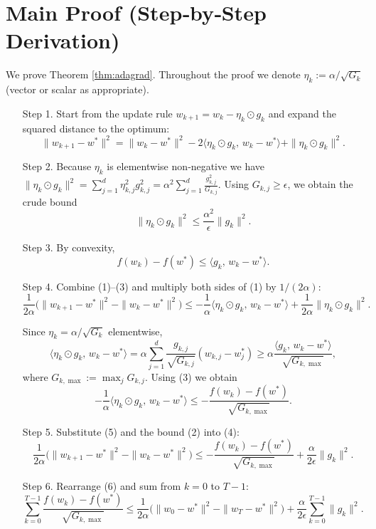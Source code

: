 \documentclass{article}
\begin{document}
\section*{Main Proof (Step‑by‑Step Derivation)}
We prove Theorem \ref{thm:adagrad}.  Throughout the proof we denote
$\eta_k:=\alpha/\sqrt{G_k}$ (vector or scalar as appropriate).

\begin{enumerate}
\item[Step 1.]  Start from the update rule $w_{k+1}=w_k-\eta_k\odot g_k$ and expand the squared distance to the optimum:
\[
\|w_{k+1}-w^{\ast}\|^{2}
= \|w_k-w^{\ast}\|^{2}
-2\langle\eta_k\odot g_k,\,w_k-w^{\ast}\rangle
+\|\eta_k\odot g_k\|^{2}.
\tag{1}
\]

\item[Step 2.]  Because $\eta_k$ is elementwise non‑negative we have
$\|\eta_k\odot g_k\|^{2}= \sum_{j=1}^{d}\eta_{k,j}^{2} g_{k,j}^{2}
= \alpha^{2}\sum_{j=1}^{d}\frac{g_{k,j}^{2}}{G_{k,j}}$.
Using $G_{k,j}\ge \epsilon$, we obtain the crude bound
\[
\|\eta_k\odot g_k\|^{2}\le \frac{\alpha^{2}}{\epsilon}\|g_k\|^{2}.
\tag{2}
\]

\item[Step 3.]  By convexity,
\[
f(w_k)-f(w^{\ast})\le \langle g_k,\,w_k-w^{\ast}\rangle .
\tag{3}
\]

\item[Step 4.]  Combine (1)–(3) and multiply both sides of (1) by $1/(2\alpha)$:
\[
\frac{1}{2\alpha}\bigl(\|w_{k+1}-w^{\ast}\|^{2}-\|w_k-w^{\ast}\|^{2}\bigr)
\le -\frac{1}{\alpha}\langle\eta_k\odot g_k,\,w_k-w^{\ast}\rangle
+\frac{1}{2\alpha}\|\eta_k\odot g_k\|^{2}.
\tag{4}
\]

Since $\eta_k=\alpha/\sqrt{G_k}$ elementwise,
\[
\langle\eta_k\odot g_k,\,w_k-w^{\ast}\rangle
= \alpha\sum_{j=1}^{d}\frac{g_{k,j}}{\sqrt{G_{k,j}}}(w_{k,j}-w^{\ast}_{j})
\ge \alpha\frac{\langle g_k,\,w_k-w^{\ast}\rangle}{\sqrt{G_{k,\max}}},
\]
where $G_{k,\max}:=\max_j G_{k,j}$.  Using (3) we obtain
\[
-\frac{1}{\alpha}\langle\eta_k\odot g_k,\,w_k-w^{\ast}\rangle
\le -\frac{f(w_k)-f(w^{\ast})}{\sqrt{G_{k,\max}}}.
\tag{5}
\]

\item[Step 5.]  Substitute (5) and the bound (2) into (4):
\[
\frac{1}{2\alpha}\bigl(\|w_{k+1}-w^{\ast}\|^{2}-\|w_k-w^{\ast}\|^{2}\bigr)
\le -\frac{f(w_k)-f(w^{\ast})}{\sqrt{G_{k,\max}}}
+\frac{\alpha}{2\epsilon}\|g_k\|^{2}.
\tag{6}
\]

\item[Step 6.]  Rearrange (6) and sum from $k=0$ to $T-1$:
\[
\sum_{k=0}^{T-1}\frac{f(w_k)-f(w^{\ast})}{\sqrt{G_{k,\max}}}
\le
\frac{1}{2\alpha}\bigl(\|w_0-w^{\ast}\|^{2}-\|w_T-w^{\ast}\|^{2}\bigr)
+\frac{\alpha}{2\epsilon}\sum_{k=0}^{T-1}\|g_k\|^{2}.
\tag{7}
\]


\end{enumerate}
\end{document}
